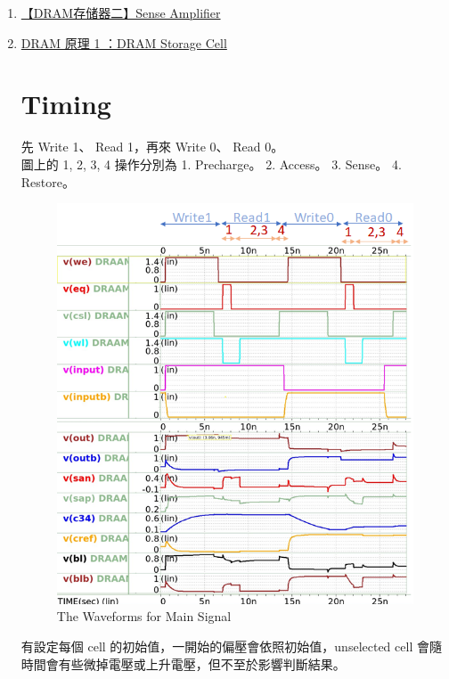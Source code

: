 \documentclass{article}
\begin{document}
  \begin{enumerate}
  
  \item\href{https://blog.csdn.net/highman110/article/details/131242849}{【DRAM存储器二】Sense Amplifier}
  \item\href{http://www.wowotech.net/basic_tech/307.html}{DRAM 原理 1 ：DRAM Storage Cell}


\clearpage
\section{Timing}

先 Write 1、 Read 1，再來 Write 0、 Read 0。\\
圖上的 1, 2, 3, 4 操作分別為
1.	Precharge。
2.	Access。
3.	Sense。
4.	Restore。


\begin{figure}[H]
  \centering
  \includegraphics[width = \linewidth]{./img/2023-12-24-17-13-43.png}
  \caption{The Waveforms for Main Signal}
  \end{figure}

  \clearpage
  有設定每個 cell 的初始值，一開始的偏壓會依照初始值，unselected cell 會隨時間會有些微掉電壓或上升電壓，但不至於影響判斷結果。


\end{enumerate}
\end{document}
